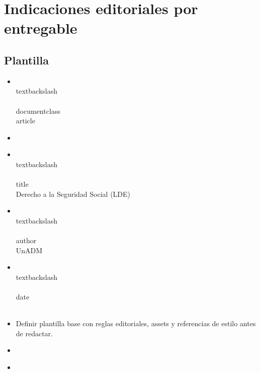 \documentclass[12pt]{article}
\begin{document}
\section*{Indicaciones editoriales por entregable}

\subsection*{Plantilla}
\begin{itemize}[leftmargin=*]
  \item \\textbackslash\\{\\}documentclass\\{article\\}
  \item \\%
  \item \\textbackslash\\{\\}title\\{Derecho a la Seguridad Social (LDE)\\}
  \item \\textbackslash\\{\\}author\\{UnADM\\}
  \item \\textbackslash\\{\\}date\\{\\}
  \item Definir plantilla base con reglas editoriales, assets y referencias de estilo antes de redactar.
  \item \\%
  \item \\%

\end{itemize}
\end{document}
